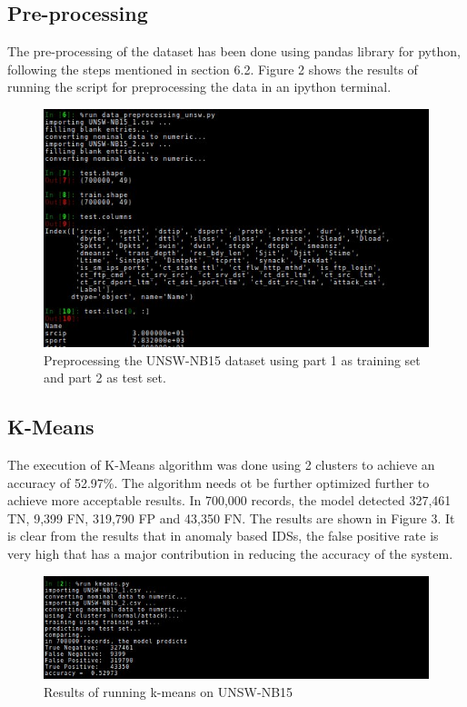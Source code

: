 \documentclass[a4paper,12pt]{article}
\begin{document}
        \subsection{Pre-processing}
        The pre-processing of the dataset has been done using pandas library for python, following the steps mentioned in section 6.2. Figure 2 shows the results of running the script for preprocessing the data in an ipython terminal.
        \begin{figure}
            \includegraphics[width=1\textwidth]{preprocessing}
            \caption{Preprocessing the UNSW-NB15 dataset using part 1 as training set and part 2 as test set.}
        \end{figure}
        \subsection{K-Means}
        The execution of K-Means algorithm was done using 2 clusters to achieve an accuracy of 52.97\%. The algorithm needs ot be further optimized further to achieve more acceptable results. In 700,000 records, the model detected 327,461 TN, 9,399 FN, 319,790 FP and 43,350 FN. The results are shown in Figure 3. It is clear from the results that in anomaly based IDSs, the false positive rate is very high that has a major contribution in reducing the accuracy of the system.
        \begin{figure}
            \includegraphics[width=1\textwidth]{kmeans}
            \caption{Results of running k-means on UNSW-NB15}
        \end{figure}
\end{document}
